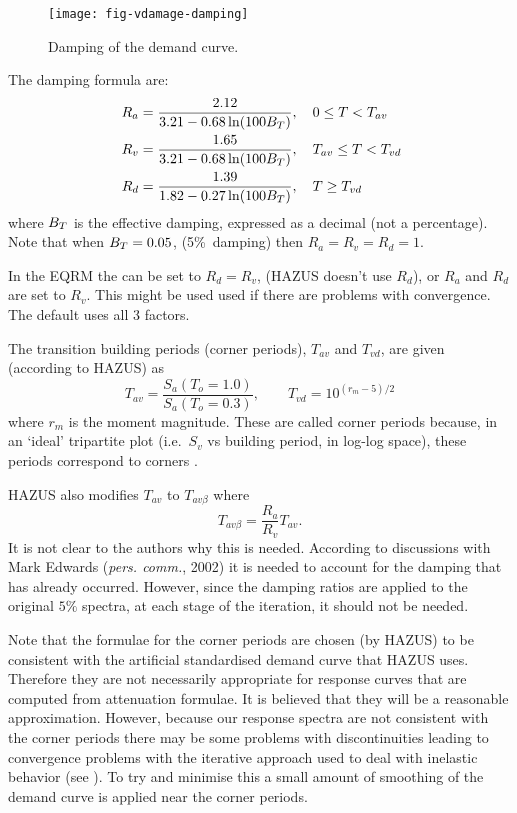 \begin{figure}[htp]
\centering
{}
\texttt{[image: fig-vdamage-damping]}
\caption{Damping of the demand curve.}
\label{fig:v-dam-damping-adrs}
\end{figure}


The damping formula are:
\begin{align}
 R_a &= \frac{2.12}{3.21-0.68\ln(100\Beff)}, \quad 0\le T < T_{av}\\
\hspace{0.3em}
 R_v &= \frac{1.65}{3.21-0.68\ln(100\Beff)}, \quad T_{av}\le T < T_{vd}\\
\hspace{0.3em}
 R_d &= \frac{1.39}{1.82-0.27\ln(100\Beff)}, \quad T \ge T_{vd}
\end{align}
where $\Beff$ is the effective damping,
expressed as a decimal (not a percentage). Note that when $\Beff =
0.05$, (5\%\ damping) then $R_a=R_v=R_d=1$.

In the EQRM the can be set to $R_d=R_v$, (HAZUS doesn't use $R_d$), or
$R_a$ and $R_d$ are set to $R_v$. This might
be used used if there are problems with convergence. The default
 uses all 3 factors.


The transition building periods (corner periods), $T_{av}$ and $T_{vd}$,
are given (according to HAZUS) as
\begin{equation}
 T_{av} = \frac{S_a(T_o =1.0)}{S_a(T_o =0.3)},
\qquad
 T_{vd} = 10^{(r_m-5)/2}
\end{equation}
where $r_m$ is the moment magnitude. These are called corner
periods because, in an `ideal' tripartite plot (i.e.~$S_v$ vs
building period, in log-log space), these periods correspond to
corners \citep{Newmark82}.

HAZUS also modifies $T_{av}$ to $T_{av\beta}$ where
$$
 T_{av\beta} = \frac{R_a}{R_v}T_{av}.
$$
It is not clear to the authors why this is needed. According to
discussions with Mark Edwards (\textit{pers. comm.}, 2002) it is
needed to account for the damping that has already occurred.
However, since the damping ratios are applied to the original
$5\%$ spectra, at each stage of the iteration, it should not be
needed.

Note that the formulae for the corner periods are chosen (by
HAZUS) to be consistent with the artificial standardised demand
curve that HAZUS uses. Therefore they are not
necessarily appropriate for response curves that are computed from
attenuation formulae. It is believed that they will be a
reasonable approximation. However, because our response spectra
are not consistent with the corner periods there may be some
problems with discontinuities leading to convergence problems with
the iterative approach used to deal with inelastic behavior (see
). To try and minimise this a small
amount of smoothing of the demand curve is
applied near the corner periods.

